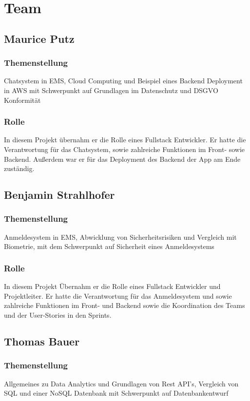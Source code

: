 \newpage
\section{Team}
\subsection{Maurice Putz}
\subsubsection{Themenstellung}
Chatsystem in EMS, Cloud Computing und Beispiel eines Backend Deployment in AWS mit Schwerpunkt auf Grundlagen im Datenschutz und DSGVO Konformität
\subsubsection{Rolle}
In diesem Projekt übernahm er die Rolle eines Fullstack Entwickler. Er hatte die Verantwortung für das Chatsystem,
sowie zahlreiche Funktionen im Front- sowie Backend. Außerdem war er für das Deployment des Backend der App am Ende zuständig.

\subsection{Benjamin Strahlhofer}
\subsubsection{Themenstellung}
Anmeldesystem in EMS, Abwicklung von Sicherheitsrisiken und Vergleich mit Biometrie, mit dem Schwerpunkt auf Sicherheit eines Anmeldesystems
\subsubsection{Rolle}
In diesem Projekt Übernahm er die Rolle eines Fullstack Entwickler und Projektleiter. Er hatte die Verantwortung für das Anmeldesystem und 
sowie zahlreiche Funktionen im Front- und Backend sowie die Koordination des Teams und der User-Stories in den Sprints.

\subsection{Thomas Bauer}
\subsubsection{Themenstellung}
Allgemeines zu Data Analytics und Grundlagen von Rest API's, Vergleich von SQL und einer NoSQL Datenbank mit Schwerpunkt auf Datenbankentwurf
